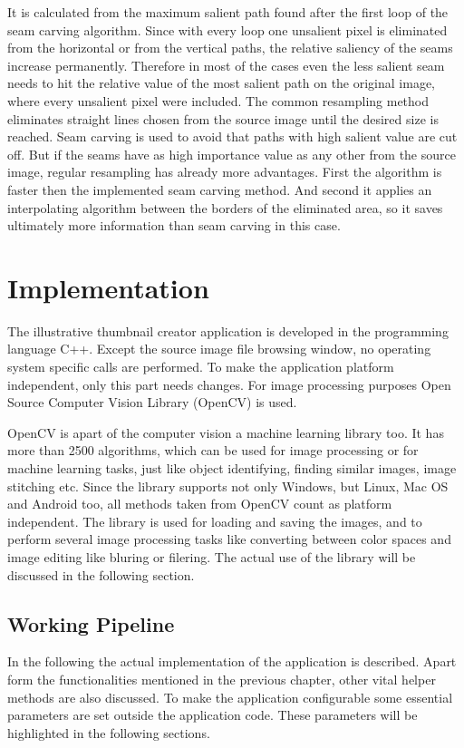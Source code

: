 \documentclass[draft,final]{vutinfth} %
\begin{document}
	It is calculated from the maximum salient path found after the first loop of the seam carving algorithm.
	Since with every loop one unsalient pixel is eliminated from the horizontal or from the vertical paths, the relative saliency of the seams increase permanently.
	Therefore in most of the cases even the less salient seam needs to hit the relative value of the most salient path on the original image, where every unsalient pixel were included. 
	The common resampling method eliminates straight lines chosen from the source image until the desired size is reached.
	Seam carving is used to avoid that paths with high salient value are cut off.
	But if the seams have as high importance value as any other from the source image, regular resampling has already more advantages.
	First the algorithm is faster then the implemented seam carving method.
	And second it applies an interpolating algorithm between the borders of the eliminated area, so it saves ultimately more information than seam carving in this case.   
	
	\chapter{Implementation}
	The illustrative thumbnail creator application is developed in the programming language C++.
	Except the source image file browsing window, no operating system specific calls are performed.
	To make the application platform independent, only this part needs changes.
	For image processing purposes Open Source Computer Vision Library (OpenCV) is used.\par 
	OpenCV is apart of the computer vision a machine learning library too.     
	It has more than 2500 algorithms, which can be used for image processing or for machine learning tasks, just like object identifying, finding similar images, image stitching etc.
	Since the library supports not only Windows, but Linux, Mac OS and Android too, all methods taken from OpenCV count as platform independent.
	The library is used for loading and saving the images, and to perform several image processing tasks like converting between color spaces and image editing like bluring or filering.
	The actual use of the library will be discussed in the following section.
	
	\section{Working Pipeline}
	In the following the actual implementation of the application is described.
	Apart form the functionalities mentioned in the previous chapter, other vital helper methods are also discussed.
	To make the application configurable some essential parameters are set outside the application code. These parameters will be highlighted in the following sections.
	
\end{document}
